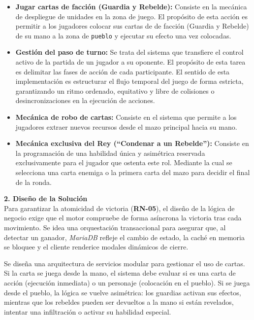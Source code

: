 \begin{itemize}
    \item \textbf{Jugar cartas de facción (Guardia y Rebelde):} Consiste en la mecánica de despliegue de unidades en la zona de juego. El propósito de esta acción es permitir a los jugadores colocar sus cartas de de facción (Guardia y Rebelde) de su mano a la zona de \texttt{pueblo} y ejecutar su efecto una vez colocadas.

    \item \textbf{Gestión del paso de turno:} Se trata del sistema que transfiere el control activo de la partida de un jugador a su oponente. El propósito de esta tarea es delimitar las fases de acción de cada participante. El sentido de esta implementación es estructurar el flujo temporal del juego de forma estricta, garantizando un ritmo ordenado, equitativo y libre de colisiones o desincronizaciones en la ejecución de acciones.

    \item \textbf{Mecánica de robo de cartas:} Consiste en el sistema que permite a los jugadores extraer nuevos recursos desde el mazo principal hacia su mano.

    \item \textbf{Mecánica exclusiva del Rey (``Condenar a un Rebelde''):} Consiste en la programación de una habilidad única y asimétrica reservada exclusivamente para el jugador que ostenta este rol. Mediante la cual se selecciona una carta enemiga o la primera carta del mazo para decidir el final de la ronda.
\end{itemize}

\textbf{2. Diseño de la Solución} \\
Para garantizar la atomicidad de victoria (\textbf{RN-05}), el diseño de la lógica de negocio exige que el motor compruebe de forma asíncrona la victoria tras cada movimiento. Se idea una orquestación transaccional para asegurar que, al detectar un ganador, \textit{MariaDB} refleje el cambio de estado, la caché en memoria se bloquee y el cliente renderice modales dinámicos de cierre.

Se diseña una arquitectura de servicios modular para gestionar el uso de cartas. Si la carta se juega desde la mano, el sistema debe evaluar si es una carta de acción (ejecución inmediata) o un personaje (colocación en el pueblo). Si se juega desde el pueblo, la lógica se vuelve asimétrica: los guardias activan sus efectos, mientras que los rebeldes pueden ser devueltos a la mano si están revelados, intentar una infiltración o activar su habilidad especial.

